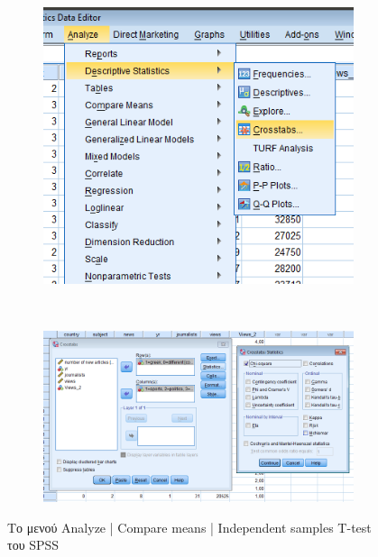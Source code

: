 \documentclass{assignment}
\begin{document}
\begin{Assignment}[Μέρος Β]
\begin{figure}[htbp]
  \centering
  \begin{subfigure}[b]{0.5\textwidth}
     \includegraphics[width=\textwidth,height=0.25\textheight]{images/menu_crosstabs.png}
  \end{subfigure}%
   ~ %
  \begin{subfigure}[b]{0.5\textwidth}
    \includegraphics[width=\textwidth,height=0.25\textheight]{images/crosstabs.png}
  \end{subfigure}
  \caption{Το μενού Analyze | Compare means | Independent samples T-test του SPSS}
\label{fig:crosstabs}
\end{figure}



\end{Assignment}
\end{document}
